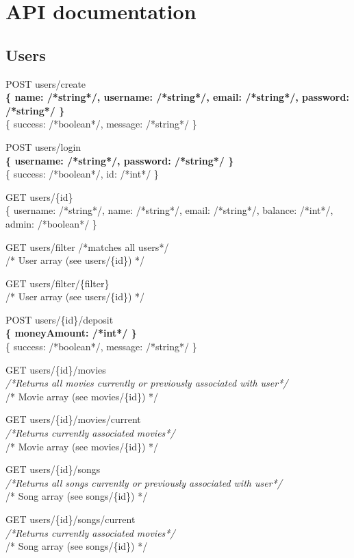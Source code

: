 \section{API documentation}
\label{app:apidoc}

\subsection{Users}

POST users/create\\
\textbf{\{ name: /*string*/, username: /*string*/, email: /*string*/, password: /*string*/ \}}\\
\{ success: /*boolean*/, message: /*string*/ \}

POST users/login\\
\textbf{\{ username: /*string*/, password: /*string*/ \}}\\
\{ success: /*boolean*/, id: /*int*/ \}

GET  users/\{id\}\\
\{ username: /*string*/, name: /*string*/, email: /*string*/, balance: /*int*/, admin: /*boolean*/ \}

GET  users/filter /*matches all users*/ \\
/* User array (see users/\{id\}) */

GET  users/filter/\{filter\} \\
/* User array (see users/\{id\}) */

POST users/\{id\}/deposit\\
\textbf{\{ moneyAmount: /*int*/ \}}\\
\{ success: /*boolean*/, message: /*string*/ \}

GET  users/\{id\}/movies\\
\emph{/*Returns all movies currently or previously associated with user*/}\\
/* Movie array (see movies/\{id\}) */

GET  users/\{id\}/movies/current\\
\emph{/*Returns currently associated movies*/}\\
/* Movie array (see movies/\{id\}) */

GET  users/\{id\}/songs\\
\emph{/*Returns all songs currently or previously associated with user*/}\\
/* Song array (see songs/\{id\}) */

GET  users/\{id\}/songs/current\\
\emph{/*Returns currently associated movies*/}\\
/* Song array (see songs/\{id\}) */

